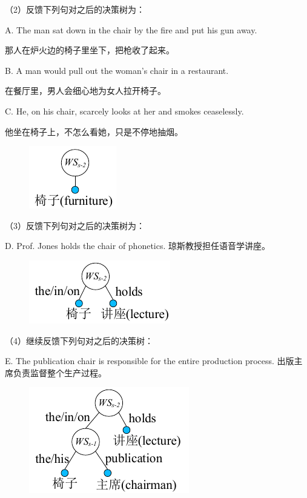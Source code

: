 （2）反馈下列句对之后的决策树为：

A. The man sat down in the chair by the fire and put his gun away.

那人在炉火边的椅子里坐下，把枪收了起来。

B. A man would pull out the woman's chair in a restaurant.

在餐厅里，男人会细心地为女人拉开椅子。

C. He, on his chair, scarcely looks at her and smokes ceaselessly.

他坐在椅子上，不怎么看她，只是不停地抽烟。

\begin{figure}[!h]
	\centering
	\includegraphics{Figure/Figure_5_0_2.pdf}
\end{figure}

（3）反馈下列句对之后的决策树为：

D. Prof. Jones holds the chair of phonetics.
琼斯教授担任语音学讲座。

\begin{figure}[!h]
	\centering
	\includegraphics{Figure/Figure_5_0_3.pdf}
\end{figure}

（4）继续反馈下列句对之后的决策树：

E. The publication chair is responsible for the entire production process.
出版主席负责监督整个生产过程。

\begin{figure}[!h]
	\centering
	\includegraphics{Figure/Figure_5_0_4.pdf}
\end{figure}

